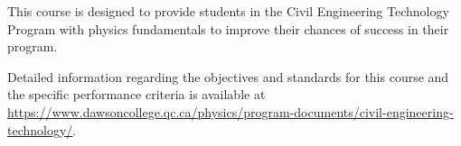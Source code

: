 {This course is designed to provide students in the Civil Engineering Technology Program with physics fundamentals to improve their chances of success in their program.
\smallskip

Detailed information regarding the objectives and standards for this course and the specific performance criteria is available at \url{https://www.dawsoncollege.qc.ca/physics/program-documents/civil-engineering-technology/}.}
